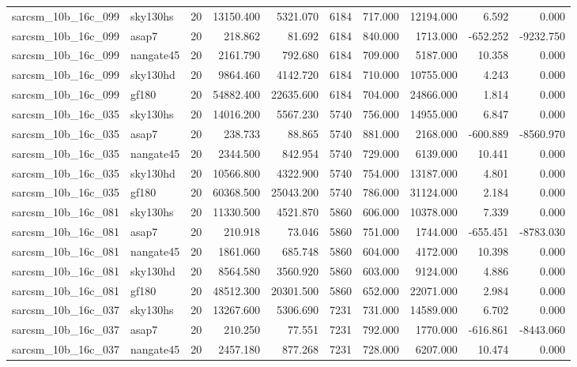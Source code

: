 \begin{tabular}{llrrrrrrrr}
sarcsm\_10b\_16c\_099 & sky130hs & 20 & 13150.400 & 5321.070 & 6184 & 717.000 & 12194.000 & 6.592 & 0.000 \\
sarcsm\_10b\_16c\_099 & asap7 & 20 & 218.862 & 81.692 & 6184 & 840.000 & 1713.000 & -652.252 & -9232.750 \\
sarcsm\_10b\_16c\_099 & nangate45 & 20 & 2161.790 & 792.680 & 6184 & 709.000 & 5187.000 & 10.358 & 0.000 \\
sarcsm\_10b\_16c\_099 & sky130hd & 20 & 9864.460 & 4142.720 & 6184 & 710.000 & 10755.000 & 4.243 & 0.000 \\
sarcsm\_10b\_16c\_099 & gf180 & 20 & 54882.400 & 22635.600 & 6184 & 704.000 & 24866.000 & 1.814 & 0.000 \\
sarcsm\_10b\_16c\_035 & sky130hs & 20 & 14016.200 & 5567.230 & 5740 & 756.000 & 14955.000 & 6.847 & 0.000 \\
sarcsm\_10b\_16c\_035 & asap7 & 20 & 238.733 & 88.865 & 5740 & 881.000 & 2168.000 & -600.889 & -8560.970 \\
sarcsm\_10b\_16c\_035 & nangate45 & 20 & 2344.500 & 842.954 & 5740 & 729.000 & 6139.000 & 10.441 & 0.000 \\
sarcsm\_10b\_16c\_035 & sky130hd & 20 & 10566.800 & 4322.900 & 5740 & 754.000 & 13187.000 & 4.801 & 0.000 \\
sarcsm\_10b\_16c\_035 & gf180 & 20 & 60368.500 & 25043.200 & 5740 & 786.000 & 31124.000 & 2.184 & 0.000 \\
sarcsm\_10b\_16c\_081 & sky130hs & 20 & 11330.500 & 4521.870 & 5860 & 606.000 & 10378.000 & 7.339 & 0.000 \\
sarcsm\_10b\_16c\_081 & asap7 & 20 & 210.918 & 73.046 & 5860 & 751.000 & 1744.000 & -655.451 & -8783.030 \\
sarcsm\_10b\_16c\_081 & nangate45 & 20 & 1861.060 & 685.748 & 5860 & 604.000 & 4172.000 & 10.398 & 0.000 \\
sarcsm\_10b\_16c\_081 & sky130hd & 20 & 8564.580 & 3560.920 & 5860 & 603.000 & 9124.000 & 4.886 & 0.000 \\
sarcsm\_10b\_16c\_081 & gf180 & 20 & 48512.300 & 20301.500 & 5860 & 652.000 & 22071.000 & 2.984 & 0.000 \\
sarcsm\_10b\_16c\_037 & sky130hs & 20 & 13267.600 & 5306.690 & 7231 & 731.000 & 14589.000 & 6.702 & 0.000 \\
sarcsm\_10b\_16c\_037 & asap7 & 20 & 210.250 & 77.551 & 7231 & 792.000 & 1770.000 & -616.861 & -8443.060 \\
sarcsm\_10b\_16c\_037 & nangate45 & 20 & 2457.180 & 877.268 & 7231 & 728.000 & 6207.000 & 10.474 & 0.000 \\

\end{tabular}
